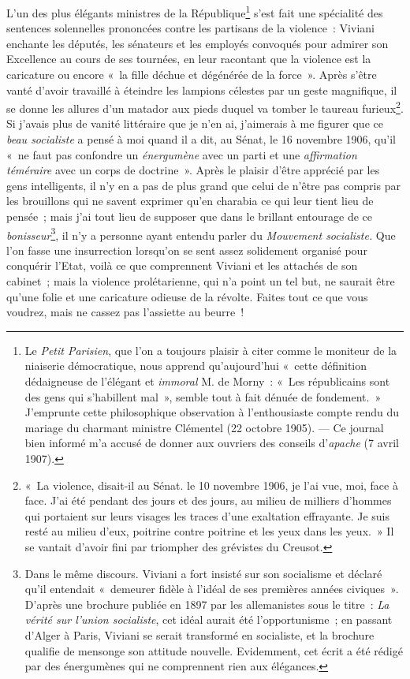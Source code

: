 \documentclass[french,twoside]{book} %
\begin{document}
 L’un des plus élégants ministres de la République\footnote{ \noindent Le \emph{Petit Parisien}, que l’on a toujours plaisir à citer comme le moniteur de la niaiserie démocratique, nous apprend qu’aujourd’hui « cette définition dédaigneuse de l’élégant et \emph{immoral} M. de Morny : « Les républicains sont des gens qui s’habillent mal », semble tout à fait dénuée de fondement. » J’emprunte cette philosophique observation à l’enthousiaste compte rendu du mariage du charmant ministre Clémentel (22 octobre 1905). — Ce journal bien informé m’a accusé de donner aux ouvriers des conseils d’\emph{apache} (7 avril 1907).
 } s’est fait une spécialité des sentences solennelles prononcées contre les partisans de la violence : Viviani enchante les députés, les sénateurs et les employés convoqués pour admirer son Excellence au cours de ses tournées, en leur racontant que la violence est la caricature ou encore « la fille déchue et dégénérée de la force ». Après s’être vanté d’avoir travaillé à éteindre les lampions célestes par un geste magnifique, il se donne les allures d’un matador aux pieds duquel va tomber le taureau furieux\footnote{ \noindent « La violence, disait-il au Sénat. le 10 novembre 1906, je l’ai vue, moi, face à face. J’ai été pendant des jours et des jours, au milieu de milliers d’hommes qui portaient sur leurs visages les traces d’une exaltation effrayante. Je suis resté au milieu d’eux, poitrine contre poitrine et les yeux dans les yeux. » Il se vantait d’avoir fini par triompher des grévistes du Creusot.
 }. Si j’avais plus de vanité littéraire que je n’en ai, j’aimerais à me figurer que ce \emph{beau socialiste} a pensé à moi quand il a dit, au Sénat, le 16 novembre 1906, qu’il « ne faut pas confondre un \emph{énergumène} avec un parti et une \emph{affirmation téméraire} avec un corps de doctrine ». Après le plaisir  d’être apprécié par les gens intelligents, il n’y en a pas de plus grand que celui de n’être pas compris par les brouillons qui ne savent exprimer qu’en charabia ce qui leur tient lieu de pensée ; mais j’ai tout lieu de supposer que dans le brillant entourage de ce \emph{bonisseur}\footnote{ \noindent Dans le même discours. Viviani a fort insisté sur son socialisme et déclaré qu’il entendait « demeurer fidèle à l’idéal de ses premières années civiques ». D’après une brochure publiée en 1897 par les allemanistes sous le titre : \emph{La vérité sur l’union socialiste}, cet idéal aurait été l’opportunisme ; en passant d’Alger à Paris, Viviani se serait transformé en socialiste, et la brochure qualifie de mensonge son attitude nouvelle. Evidemment, cet écrit a été rédigé par des énergumènes qui ne comprennent rien aux élégances.
 }, il n’y a personne ayant entendu parler du \emph{Mouvement socialiste. }Que l’on fasse une insurrection lorsqu’on se sent assez solidement organisé pour conquérir l’Etat, voilà ce que comprennent Viviani et les attachés de son cabinet ; mais la violence prolétarienne, qui n’a point un tel but, ne saurait être qu’une folie et une caricature odieuse de la révolte. Faites tout ce que vous voudrez, mais ne cassez pas l’assiette au beurre !
\end{document}
